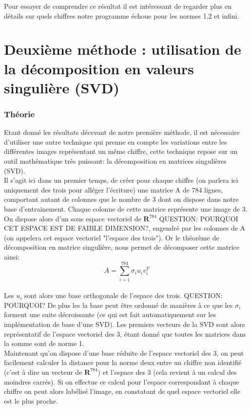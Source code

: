 \documentclass[a4paper,11pt,twoside]{report}
\begin{document}
Pour essayer de comprendre ce résultat il est intéressant de regarder plus en détails sur quels chiffres notre programme échoue pour les normes 1,2 et infini.





\chapter{Deuxième méthode : utilisation de la décomposition en valeurs singulière (SVD)}
\subsection{Théorie}
Etant donné les résultats décevant de notre première méthode, il est nécessaire d'utiliser une autre technique qui prenne en compte les variations entre les différentes images représentant un même chiffre, cette technique repose sur un outil mathématique très puissant: la décomposition en matrices singulières (SVD).\\
Il s'agit ici dans un premier temps, de créer pour chaque chiffre (on parlera ici uniquement des trois pour alléger l'écriture) une matrice A de 784 lignes, comportant autant de colonnes que le nombre de 3 dont on dispose dans notre base d'entrainement. Chaque colonne de cette matrice représente une image de 3. On dispose alors d'un sous espace vectoriel de $\textbf{R}^{784}$ QUESTION: POURQUOI CET ESPACE EST DE FAIBLE DIMENSION?, engendré par les colonnes de A (on appelera cet espace vectoriel "l'espace des trois"). Or le théorème de décomposition en matrice singulière, nous permet de décomposer cette matrice ainsi: $$A = \sum_{i=1}^{784}{\sigma_{i}u_{i}v_{i}^{T}}$$\\
Les $u_{i}$ sont alors une base orthogonale de l'espace des trois. QUESTION: POURQUOI? De plus les la base peut être ordonné de manières à ce que les $\sigma_{i}$ forment une suite décroissante (ce qui est fait automatiquement sur les implémentation de base d'une SVD). Les premiers vecteurs de la SVD sont alors représentatif de l'espace vectoriel des 3, étant donné que toutes les matrices dans la somme sont de norme 1.\\
Maintenant qu'on dispose d'une base réduite de l'espace vectoriel des 3, on peut facilement calculer la distance pour la norme deux entre un chiffre non identifié (c'est à dire un vecteur de  $\textbf{R}^{784}$) et l'espace des 3 (cela revient à un calcul des moindres carrés). Si on effectue ce calcul pour l'espace correspondant à chaque chiffre on peut alors labélisé l'image, en constatant de quel espace vectoriel elle est le plus proche.
\end{document}

